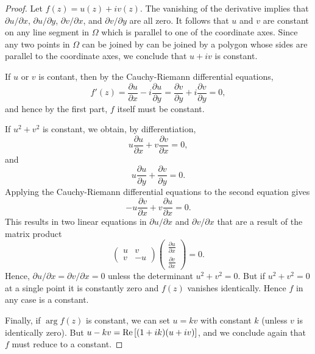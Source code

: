 \begin{proof}
	Let $f(z)=u(z)+iv(z)$. The vanishing of the derivative implies that $\partial u/\partial x$, $\partial u/\partial y$, $\partial v/\partial x$, and $\partial v/\partial y$ are all zero. It follows that $u$ and $v$ are constant on any line segment in $\Omega$ which is parallel to one of the coordinate axes. Since any two points in $\Omega$ can be joined by can be joined by a polygon whose sides are parallel to the coordinate axes, we conclude that $u+iv$ is constant.
	
	If $u$ or $v$ is contant, then by the Cauchy-Riemann differential equations, $$f'(z)=\dfrac{\partial u}{\partial x}-i\dfrac{\partial u}{\partial y}=\dfrac{\partial v}{\partial y}+i\dfrac{\partial v}{\partial y}=0,$$ and hence by the first part, $f$ itself must be constant.
	
	If $u^2+v^2$ is constant, we obtain, by differentiation, $$u \dfrac{\partial u}{\partial x}+v \dfrac{\partial v}{\partial x}=0,$$ and $$u \dfrac{\partial u}{\partial y}+\dfrac{\partial v}{\partial y}=0.$$ Applying the Cauchy-Riemann differential equations to the second equation gives $$-u \dfrac{\partial v}{\partial x}+v\dfrac{\partial u}{\partial x}=0.$$ This results in two linear equations in $\partial u/\partial x$ and $\partial v/\partial x$ that are a result of the matrix product $$\begin{pmatrix}
		u & v \\
		v &-u
	\end{pmatrix}\begin{pmatrix}
	\frac{\partial u}{\partial x} \\
	\frac{\partial v}{\partial x}
	\end{pmatrix}=0.$$ Hence, $\partial u/\partial x=\partial v/\partial x=0$ unless the determinant $u^2+v^2=0$. But if $u^2+v^2=0$ at a single point it is constantly zero and $f(z)$ vanishes identically. Hence $f$ in any case is a constant.
	
	Finally, if $\arg f(z)$ is constant, we can set $u=kv$ with constant $k$ (unless $v$ is identically zero). But $u-kv=\operatorname{Re} \left[(1+ik)(u+iv)\right]$, and we conclude again that $f$ must reduce to a constant.
\end{proof}


